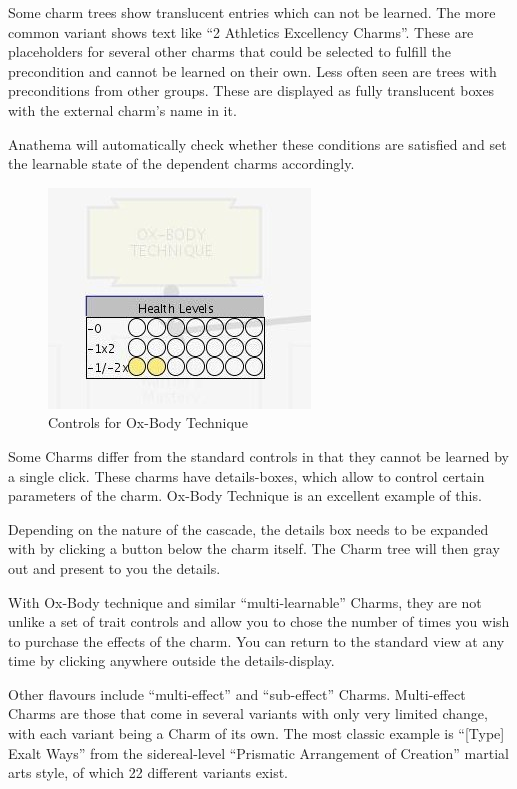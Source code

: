 Some charm trees show translucent entries which can not be learned. The more common variant shows text like "`2 Athletics Excellency Charms"'. These are placeholders for several other charms that could be selected to fulfill the precondition and cannot be learned on their own. Less often seen are trees with preconditions from other groups. These are displayed as fully translucent boxes with the external charm's name in it.

Anathema will automatically check whether these conditions are satisfied and set the learnable state of the dependent charms accordingly. 

\begin{figure}
	\centering
		\includegraphics{images/OxBodyTechnique.jpg}
	\caption{Controls for Ox-Body Technique}
	\label{fig:OxBodyTechnique}
\end{figure}

Some Charms differ from the standard controls in that they cannot be learned by a single click. These charms have details-boxes, which allow to control certain parameters of the charm. Ox-Body Technique is an excellent example of this. 

Depending on the nature of the cascade, the details box needs to be expanded with by clicking a button below the charm itself. The Charm tree will then gray out and present to you the details.

With Ox-Body technique and similar "`multi-learnable"' Charms, they are not unlike a set of trait controls and allow you to chose the number of times you wish to purchase the effects of the charm. You can return to the standard view at any time by clicking anywhere outside the details-display.

Other flavours include "`multi-effect"' and "`sub-effect"' Charms. Multi-effect Charms are those that come in several variants with only very limited change, with each variant being a Charm of its own. The most classic example is "`[Type] Exalt Ways"' from the sidereal-level "`Prismatic Arrangement of Creation"' martial arts style, of which 22 different variants exist.

